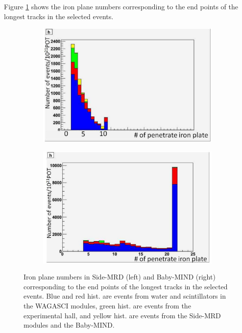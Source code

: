 Figure \ref{fig:endpoint_longest_track_neutrino} shows the iron plane numbers corresponding to the end points of the longest tracks in the selected events.

\begin{figure}[tbh]
  \begin{center}
   \begin{subfigure}{0.48\textwidth}
     \includegraphics[width=\linewidth]{fig/endpoint_sidemrd_longest_track_neutrino.pdf}
    \end{subfigure}
  \begin{subfigure}{0.48\textwidth}
      \includegraphics[width=\linewidth]{fig/endpoint_babymind_longest_track_neutrino.pdf}
    \end{subfigure}    
    \end{center}
  \caption{
Iron plane numbers in Side-MRD (left) and Baby-MIND (right) corresponding to the end points of the longest tracks in the selected events.
Blue and red hist. are events from water and scintillators in the WAGASCI modules, green hist. are events from the experimental hall, and yellow hist. are events from the Side-MRD modules and the Baby-MIND.
}
\label{fig:endpoint_longest_track_neutrino}
\end{figure}

